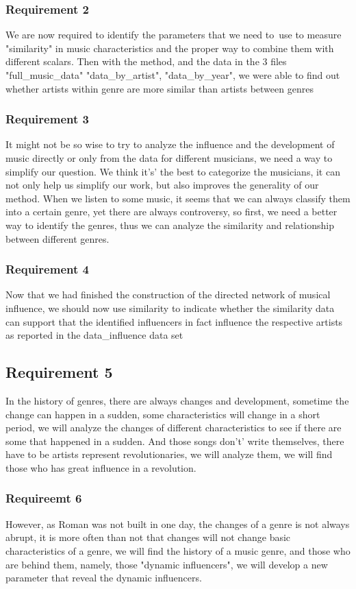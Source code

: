 \documentclass{article}
\begin{document}
\subsubsection{Requirement 2}
We are now required to identify the parameters that we need to\
use to measure "similarity" in music
characteristics and the proper way to combine them with different scalars. Then with the method,
and the data in the 3 files "full\_music\_data"
"data\_by\_artist", "data\_by\_year",
we were able to find out whether  artists
within genre  are more similar  than artists between genres\par
\subsubsection{Requirement 3}
It might not be so wise to try to analyze the influence and the development of music directly or only from the data for different musicians, we need a way to simplify our question.
We think it's' the best to categorize the musicians, it can not only help us simplify our work, but also  improves the generality of our method.
When we listen to some music, it seems that we can always classify them into a certain genre, yet there are always controversy, so first, we need a better way to identify the genres, thus we can analyze
the similarity and relationship between different genres.
\subsubsection{Requirement 4}
Now that we had finished the construction of the directed network
of musical influence, we should now use similarity to indicate whether the similarity data can support
that the identified influencers in fact influence the respective
artists as reported in the data\_influence data set
\subsection{Requirement 5}
In the history of genres, there are always changes and development, sometime the change can happen in a sudden, some characteristics will change in a short period,
we will analyze the changes
of different characteristics to see if there are some that happened in a sudden. And those songs don't' write themselves,
there have to be artists represent revolutionaries, we will analyze them, we will find those who has great influence in a revolution.
\subsubsection{Requireemt 6}
However, as Roman was not built in one day, the changes of a genre is not always abrupt, it is more often than not that changes will not change basic characteristics of
a genre, we will find the history of a music genre, and those who are behind them, namely, those "dynamic influencers", we will develop a new parameter
that reveal the dynamic influencers.
\end{document}
